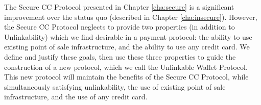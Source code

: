 The Secure CC Protocol presented in Chapter \ref{cha:secure} is a significant improvement over the status quo (described in Chapter \ref{cha:insecure}).
However, the Secure CC Protocol neglects to provide two properties (in addition to Unlinkability) which we find desirable in a payment protocol:
  the ability to use existing point of sale infrastructure, and the ability to use any credit card.
We define and justify these goals, then use these three properties to guide the construction of a new protocol, which we call the Unlinkable Wallet Protocol.
This new protocol will maintain the benefits of the Secure CC Protocol, while simultaneously satisfying unlinkability,
  the use of existing point of sale infrastructure, and the use of any credit card.
